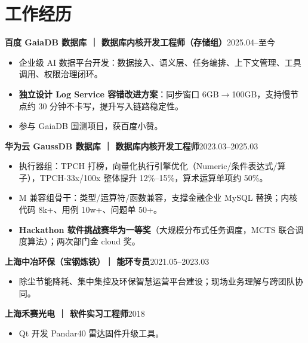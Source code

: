 \documentclass[11pt,a4paper]{article}
\begin{document}
\section{工作经历}
\textbf{百度 GaiaDB 数据库 ｜ 数据库内核开发工程师（存储组）}\hfill 2025.04--至今\par
\begin{itemize}
\item 企业级 AI 数据平台开发：数据接入、语义层、任务编排、上下文管理、工具调用、权限治理闭环。
\item \textbf{独立设计 Log Service 容错改进方案}：同步窗口 6GB$\to$100GB，支持慢节点约 30 分钟不卡写，提升写入链路稳定性。
\item 参与 GaiaDB 国测项目，获百度小赞。
\end{itemize}
\textbf{华为云 GaussDB 数据库 ｜ 数据库内核开发工程师}\hfill 2023.03--2025.03\par
\begin{itemize}
\item 执行器组：TPCH 打榜，向量化执行引擎优化（Numeric/条件表达式/算子），TPCH-33x/100x 整体提升 12\%--15\%，算术运算单项约 50\%。
\item M 兼容组骨干：类型/运算符/函数兼容，支撑金融企业 MySQL 替换；内核代码 8k+、用例 10w+、问题单 50+。
\item \textbf{Hackathon 软件挑战赛华为一等奖}（大规模分布式任务调度，MCTS 联合调度算法）；两次部门金 cloud 奖。
\end{itemize}
\textbf{上海中冶环保（宝钢炼铁）｜ 能环专员}\hfill 2021.05--2023.03\par
\begin{itemize}\item 除尘节能降耗、集中集控及环保智慧运营平台建设；现场业务理解与跨团队协同。\end{itemize}
\textbf{上海禾赛光电 ｜ 软件实习工程师}\hfill 2018\par
\begin{itemize}\item Qt 开发 Pandar40 雷达固件升级工具。\end{itemize}
\end{document}
